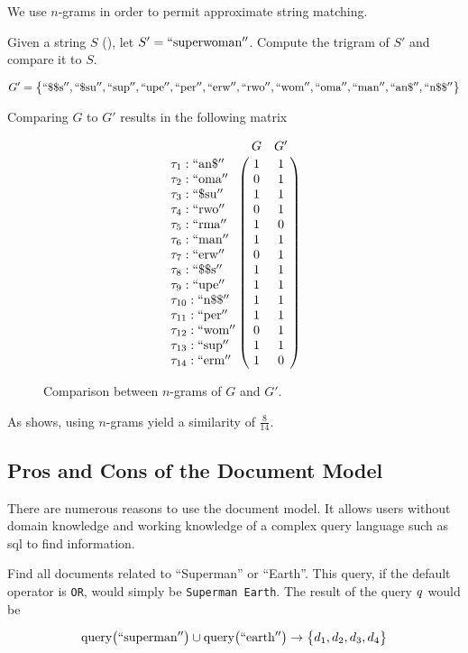 		We use $n$-grams in order to permit approximate string matching.
		
		\begin{ex}
		\label{ex:n-gram-comparison}
			Given a string $S$ (), let $S' = \mathrm{``superwoman''}$.  Compute the trigram of $S'$ and compare it to $S$.
			
			\[
				G' = \bigl\{
					\mathrm{``\char"24\char"24s''},
					\mathrm{``\char"24su''},
					\mathrm{``sup''},
					\mathrm{``upe''},
					\mathrm{``per''},
					\mathrm{``erw''},
					\mathrm{``rwo''},
					\mathrm{``wom''},
					\mathrm{``oma''},
					\mathrm{``man''},
					\mathrm{``an\char"24''},
					\mathrm{``n\char"24\char"24''}
				\bigr\}
			\]
			
			Comparing $G$ to $G'$ results in the following matrix
			
			\begin{figure}[!ht]
				\[
					\bordermatrix{
						~ & G & G' \cr
						\term_1 : \mathrm{``an\char"24''} & 1 & 1 \cr
						\term_2 : \mathrm{``oma''} & 0 & 1 \cr
						\term_3 : \mathrm{``\char"24su''} & 1 & 1 \cr
						\term_4 : \mathrm{``rwo''} & 0 & 1 \cr
						\term_5 : \mathrm{``rma''} & 1 & 0 \cr
						\term_6 : \mathrm{``man''} & 1 & 1 \cr
						\term_7 : \mathrm{``erw''} & 0 & 1 \cr
						\term_8 : \mathrm{``\char"24\char"24s''} & 1 & 1 \cr
						\term_9 : \mathrm{``upe''} & 1 & 1 \cr
						\term_{10} : \mathrm{``n\char"24\char"24''} & 1 & 1 \cr
						\term_{11} : \mathrm{``per''} & 1 & 1 \cr
						\term_{12} : \mathrm{``wom''} & 0 & 1 \cr
						\term_{13} : \mathrm{``sup''} & 1 & 1 \cr
						\term_{14} : \mathrm{``erm''} & 1 & 0 \cr
					}
				\]
				
				\caption{Comparison between $n$-grams of $G$ and $G'$.}
				\label{fig:n-gram-misspelling-comparison}
			\end{figure}
			
			As  shows, using $n$-grams yield a similarity of $\frac{8}{14}$.
		\end{ex}
			
	\subsection{Pros and Cons of the Document Model}
		There are numerous reasons to use the document model.  It allows users without domain knowledge and working knowledge of a complex query language such as \gls{sql} to find information.
		
		\begin{ex}
			Find all documents related to ``Superman'' or ``Earth''.  This query, if the default operator is \texttt{OR}, would simply be \texttt{Superman Earth}.  The result of the query $q$ would be
			
			\[
			    \operatorname{query}\bigl(\mathrm{``superman''}\bigr) \cup \operatorname{query}\bigl(\mathrm{``earth''}\bigr) \rightarrow \bigl\{d_1, d_2, d_3, d_4\bigr\}
		    \]
		\end{ex}
		
